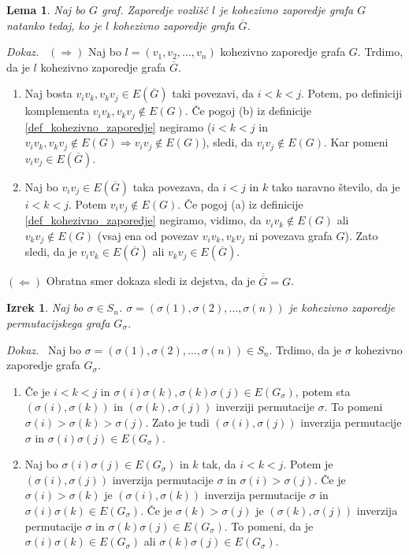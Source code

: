 \documentclass[a4paper, 12pt]{book}
\newtheorem{lema}{Lema}[chapter]
\newtheorem{izrek}{Izrek}[chapter]
\newenvironment{dokaz}{\emph{Dokaz.}\ }{\hspace{\fill}{$\Box$}}
\begin{document}
\begin{lema}
\label{lema0}
    Naj bo $G$ graf. Zaporedje vozlišč $l$ je kohezivno zaporedje grafa $G$ natanko tedaj, ko je $l$ kohezivno zaporedje grafa $\overline{G}$. 
\end{lema}
\begin{dokaz}
    $(\Rightarrow)$ Naj bo $l = (v_1, v_2, ..., v_n)$ kohezivno zaporedje grafa $G$. Trdimo, da je $l$ kohezivno zaporedje grafa $\overline{G}$. 
    \begin{enumerate}[label=(\alph*)]
        \item Naj bosta $v_iv_k, v_kv_j \in E(\overline{G})$ taki povezavi, da $i < k < j$. Potem, po definiciji komplementa $v_iv_k, v_kv_j \notin E(G)$. Če pogoj (b) iz definicije \ref{def_kohezivno_zaporedje} negiramo ($i < k < j$ in $v_iv_k, v_kv_j \notin E(G) \Rightarrow v_iv_j \notin E(G)$), sledi, da $v_iv_j \notin E(G)$. Kar pomeni $v_iv_j \in E(\overline{G})$.
        \item Naj bo $v_iv_j \in E(\overline{G})$ taka povezava, da $i < j$ in $k$ tako naravno število, da je $i < k < j$. Potem $v_iv_j \notin E(G)$. Če pogoj (a) iz definicije \ref{def_kohezivno_zaporedje} negiramo, vidimo, da $v_iv_k \notin E(G)$ ali $v_kv_j \notin E(G)$ (vsaj ena od povezav $v_iv_k, v_kv_j$ ni povezava grafa $G$). Zato sledi, da je $v_iv_k \in E(\overline{G})$ ali $v_kv_j \in E(\overline{G})$. 
    \end{enumerate}
    $(\Leftarrow)$ Obratna smer dokaza sledi iz dejstva, da je $\overline{\overline{G}} = G$.
\end{dokaz}

\begin{izrek}
\label{izrek_sigma_kohezivno_zaporedje}
    Naj bo $\sigma \in S_n$. $\sigma = (\sigma(1), \sigma(2), ..., \sigma(n))$ je kohezivno zaporedje permutacijskega grafa $G_{\sigma}$.
\end{izrek}
\begin{dokaz}
    Naj bo $\sigma = (\sigma(1), \sigma(2), ..., \sigma(n)) \in S_n$. Trdimo, da je $\sigma$ kohezivno zaporedje grafa $G_{\sigma}$. 
    \begin{enumerate}[label=(\alph*)]
        \item Če je $i < k < j$ in $\sigma(i)\sigma(k), \sigma(k)\sigma(j) \in E(G_{\sigma})$, potem sta $(\sigma(i),\sigma(k))$ in $(\sigma(k),\sigma(j))$ inverziji permutacije $\sigma$. To pomeni $\sigma(i) > \sigma(k) > \sigma(j)$. Zato je tudi $(\sigma(i),\sigma(j))$ inverzija permutacije $\sigma$ in $\sigma(i)\sigma(j) \in E(G_{\sigma})$.        

        \item Naj bo $\sigma(i)\sigma(j) \in E(G_{\sigma})$ in $k$ tak, da $i < k < j$. Potem je $(\sigma(i),\sigma(j))$ inverzija permutacije $\sigma$ in $\sigma(i) > \sigma(j)$. Če je $\sigma(i) > \sigma(k)$ je $(\sigma(i),\sigma(k))$ inverzija permutacije $\sigma$ in $\sigma(i)\sigma(k) \in E(G_{\sigma})$. Če je $\sigma(k) > \sigma(j)$ je $(\sigma(k), \sigma(j))$ inverzija permutacije $\sigma$ in $\sigma(k)\sigma(j) \in E(G_{\sigma})$. To pomeni, da je 
        $\sigma(i)\sigma(k) \in E(G_{\sigma})$ ali $\sigma(k)\sigma(j) \in E(G_{\sigma})$.
    \end{enumerate}
\end{dokaz}
\end{document}
